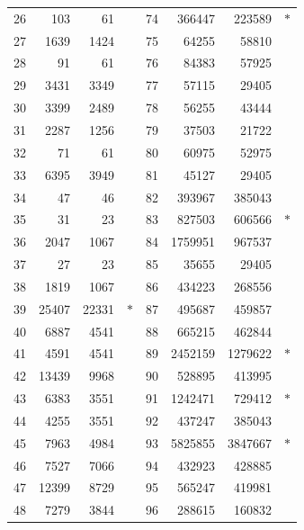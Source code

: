 \documentclass[10pt,a4paper,titlepage]{article}
\theoremstyle{plain}
\theoremstyle{definition}
\theoremstyle{remark}
\begin{document}
{\begin{longtable}{|r|r|rc||r|r|rc|}
26 & 103 & 61 &  & 74 & 366447 & 223589 & $\ast$ \\
27 & 1639 & 1424 &  & 75 & 64255 & 58810 &  \\
28 & 91 & 61 &  & 76 & 84383 & 57925 &  \\
29 & 3431 & 3349 &  & 77 & 57115 & 29405 &  \\
30 & 3399 & 2489 &  & 78 & 56255 & 43444 &  \\
31 & 2287 & 1256 &  & 79 & 37503 & 21722 &  \\
32 & 71 & 61 &  & 80 & 60975 & 52975 &  \\
33 & 6395 & 3949 &  & 81 & 45127 & 29405 &  \\
34 & 47 & 46 &  & 82 & 393967 & 385043 &  \\
35 & 31 & 23 &  & 83 & 827503 & 606566 & $\ast$ \\
36 & 2047 & 1067 &  & 84 & 1759951 & 967537 &  \\
37 & 27 & 23 &  & 85 & 35655 & 29405 &  \\
38 & 1819 & 1067 &  & 86 & 434223 & 268556 &  \\
39 & 25407 & 22331 & $\ast$ & 87 & 495687 & 459857 &  \\
40 & 6887 & 4541 &  & 88 & 665215 & 462844 &  \\
41 & 4591 & 4541 &  & 89 & 2452159 & 1279622 & $\ast$ \\
42 & 13439 & 9968 &  & 90 & 528895 & 413995 &  \\
43 & 6383 & 3551 &  & 91 & 1242471 & 729412 & $\ast$ \\
44 & 4255 & 3551 &  & 92 & 437247 & 385043 &  \\
45 & 7963 & 4984 &  & 93 & 5825855 & 3847667 & $\ast$ \\
46 & 7527 & 7066 &  & 94 & 432923 & 428885 &  \\
47 & 12399 & 8729 &  & 95 & 565247 & 419981 &  \\
48 & 7279 & 3844 &  & 96 & 288615 & 160832 &  \\
\hline
\end{longtable}
}
\end{document}
